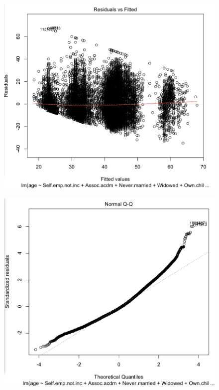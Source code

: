 \documentclass[letter]{article}
\begin{document}
\begin{figure}
 \includegraphics[scale=0.5]{figures/ageResidCensus.png}
 \caption{}
 \label{fig:ageResidCensus}
\end{figure}
 
 \begin{figure}
 \includegraphics[scale=0.5]{figures/ageNormResidCensus.png}
 \caption{}
  \label{fig:ageNormResidCensus}
\end{figure}
\end{document}
